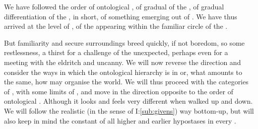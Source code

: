 We have followed the order of ontological , of gradual
 of the  , of gradual
differentiation of the , in short, of something emerging out of
. We have thus arrived at the level of 
, of the  appearing within the familiar
circle of the \hoa. 

But familiarity and secure surroundings breed quickly, if not boredom, so 
some restlessness, a thirst for a challenge of the unexpected, perhaps even
for a meeting with the eldritch and uncanny. We will now reverse the
direction and consider the ways in which the ontological hierarchy is
 in  or, what amounts to the same, how
 may organise the world. 
We will thus proceed with the categories of , with some limits of
, and move in the direction 
opposite to the order of ontological . Although  it looks and feels
very different when walked up and down. We will follow the
realistic (in the sense of I:\ref{sub:givens}) way bottom-up, but will also keep
in mind the constant  of all higher and earlier hypostases in every
. 





